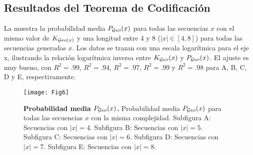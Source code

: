 \subsection{Resultados del Teorema de Codificación}


La  muestra la probabilidad media $P_{\mathcal Geo}(x)$ para todas las secuencias $x$ con el mismo valor de $K_{\mathcal Geo(x)}$ y una longitud entre 4 y 8 ($|x| \in \left[4,8 \right]$) para todas las secuencias generadas $x$. Los datos se trazan con una escala logarítmica para el eje x, ilustrando la relación logarítmica inversa entre $K_{\mathcal Geo}(x)$ y $P_{\mathcal Geo}(x)$. El ajuste es muy bueno, con $R^2=.99$, $R^2=.94$, $R^2=.97$, $R^2=.99$ y $R^2=.98$ para A, B, C, D y E, respectivamente.

\begin{figure}[!ht]
    \centering
    \texttt{[image: Fig6]}
    \caption{{\bf Probabilidad media $P_{\mathcal Geo}(x)$.} Probabilidad media $P_{\mathcal Geo}(x)$ para todas las secuencias $x$ con la misma complejidad.
    Subfigura A: Secuencias con $|x| = 4$.
    Subfigura B: Secuencias con $|x| = 5$.
    Subfigura C: Secuencias con $|x| = 6$.
    Subfigura D: Secuencias con $|x| = 7$.
    Subfigura E: Secuencias con $|x| = 8$.}
    \label{fig:codR}
\end{figure}


